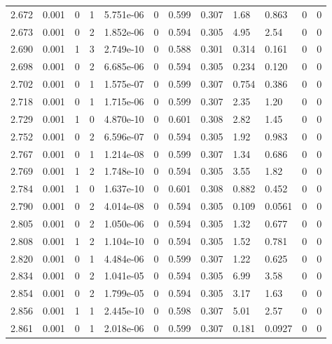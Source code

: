 \documentclass[preview]{standalone}
\begin{document}
{{{{{{\begin{tabular}{L{1.2cm}C{1.2cm} C{0.3cm}C{0.5cm} C{1.4cm}C{1.4cm} C{1.4cm}C{1.4cm} C{1.6cm}C{1.6cm} C{1.6cm}C{1.6cm}}
  2.672  &  0.001  & 0     &  1 &  5.751e-06  & 0  &  0.599&   0.307& 1.68 & 0.863   &  0 & 0  \\ 
  2.673  &  0.001  & 0     &  2 &  1.852e-06  & 0  &  0.594&   0.305& 4.95 & 2.54   &  0 & 0  \\ 
  2.690  &  0.001  & 1     &  3 &  2.749e-10  & 0  &  0.588&   0.301& 0.314 & 0.161   &  0 & 0  \\ 
  2.698  &  0.001  & 0     &  2 &  6.685e-06  & 0  &  0.594&   0.305& 0.234 & 0.120   &  0 & 0  \\ 
  2.702  &  0.001  & 0     &  1 &  1.575e-07  & 0  &  0.599&   0.307& 0.754 & 0.386   &  0 & 0  \\ 
  2.718  &  0.001  & 0     &  1 &  1.715e-06  & 0  &  0.599&   0.307& 2.35 & 1.20   &  0 & 0  \\ 
  2.729  &  0.001  & 1     &  0 &  4.870e-10  & 0  &  0.601&   0.308& 2.82 & 1.45   &  0 & 0  \\ 
  2.752  &  0.001  & 0     &  2 &  6.596e-07  & 0  &  0.594&   0.305& 1.92 & 0.983   &  0 & 0  \\ 
  2.767  &  0.001  & 0     &  1 &  1.214e-08  & 0  &  0.599&   0.307& 1.34 & 0.686   &  0 & 0  \\ 
  2.769  &  0.001  & 1     &  2 &  1.748e-10  & 0  &  0.594&   0.305& 3.55 & 1.82   &  0 & 0  \\ 
  2.784  &  0.001  & 1     &  0 &  1.637e-10  & 0  &  0.601&   0.308& 0.882 & 0.452   &  0 & 0  \\ 
  2.790  &  0.001  & 0     &  2 &  4.014e-08  & 0  &  0.594&   0.305& 0.109 & 0.0561   &  0 & 0  \\ 
  2.805  &  0.001  & 0     &  2 &  1.050e-06  & 0  &  0.594&   0.305& 1.32 & 0.677   &  0 & 0  \\ 
  2.808  &  0.001  & 1     &  2 &  1.104e-10  & 0  &  0.594&   0.305& 1.52 & 0.781   &  0 & 0  \\ 
  2.820  &  0.001  & 0     &  1 &  4.484e-06  & 0  &  0.599&   0.307& 1.22 & 0.625   &  0 & 0  \\ 
  2.834  &  0.001  & 0     &  2 &  1.041e-05  & 0  &  0.594&   0.305& 6.99 & 3.58   &  0 & 0  \\ 
  2.854  &  0.001  & 0     &  2 &  1.799e-05  & 0  &  0.594&   0.305& 3.17 & 1.63   &  0 & 0  \\ 
  2.856  &  0.001  & 1     &  1 &  2.445e-10  & 0  &  0.598&   0.307& 5.01 & 2.57   &  0 & 0  \\ 
  2.861  &  0.001  & 0     &  1 &  2.018e-06  & 0  &  0.599&   0.307& 0.181 & 0.0927   &  0 & 0  \\ 

\end{tabular}}}}}}}
\end{document}
